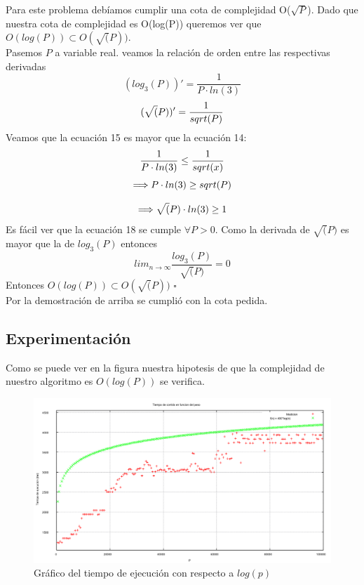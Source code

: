 \par Para este problema debíamos cumplir una cota de complejidad O($\sqrt{P}$). Dado que nuestra cota de complejidad es O(log(P))
queremos ver que $O(log(P)) \subset O(\sqrt(P))$.\\

Pasemos $P$ a variable real. veamos la relaci\'on de orden entre las respectivas derivadas \\
\begin{equation}
    (log_3(P))' = \frac{1}{P \cdot ln(3)}
\end{equation}
\begin{equation}
    (\sqrt(P))' = \frac{1}{sqrt(P)}\\
\end{equation}
Veamos que la ecuaci\'on 15 es mayor que la ecuaci\'on 14:
\begin{equation}
        \frac{1}{P \cdot ln(3)} \leq \frac{1}{sqrt(x)}\\
\end{equation}
\begin{equation}
        \Longrightarrow P \cdot ln(3) \geq sqrt(P)\\
\end{equation}

\begin{equation}
        \Longrightarrow \sqrt(P) \cdot ln(3) \geq 1\\
\end{equation}
Es f\'acil ver que la ecuaci\'on 18 se cumple $\forall P > 0$.
Como la derivada de $\sqrt(P)$ es mayor que la de $log_3(P)$ entonces 
\begin{equation}
        lim_{n \to \infty}\frac{log_3(P)}{\sqrt(P)} = 0
\end{equation}
Entonces $O(log(P)) \subset O(\sqrt(P))$ $\square$ \\
Por la demostraci\'on de arriba se cumpli\'o con la cota pedida.

\subsection{Experimentaci\'on}
Como se puede ver en la figura nuestra hipotesis de que la complejidad de nuestro algoritmo es $O(log(P))$ se verifica.

\begin{figure}
	\centering
	\includegraphics[width=1\textwidth]{images/graficoposta.png}
	\caption{Gr\'afico del tiempo de ejecuci\'on con respecto a $log(p)$}
	\label{}
\end{figure}

